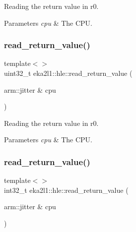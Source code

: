 Reading the return value in r0. 


\begin{DoxyParams}{Parameters}
{\em cpu} & The C\+PU. \\
\hline
\end{DoxyParams}
\mbox{\label{namespaceeka2l1_1_1hle_abddacbce52d394bce6e0b07d40fea31c}} 
\subsubsection{\texorpdfstring{read\+\_\+return\+\_\+value()}{read\_return\_value()}\hspace{0.1cm}{\footnotesize\ttfamily [2/5]}}
{\footnotesize\ttfamily template$<$$>$ \\
uint32\+\_\+t eka2l1\+::hle\+::read\+\_\+return\+\_\+value (\begin{DoxyParamCaption}\item[{arm\+::jitter \&}]{cpu }\end{DoxyParamCaption})}



Reading the return value in r0. 


\begin{DoxyParams}{Parameters}
{\em cpu} & The C\+PU. \\
\hline
\end{DoxyParams}
\mbox{\label{namespaceeka2l1_1_1hle_aa6a9bac062ed454de970279a2e54df31}} 
\subsubsection{\texorpdfstring{read\+\_\+return\+\_\+value()}{read\_return\_value()}\hspace{0.1cm}{\footnotesize\ttfamily [3/5]}}
{\footnotesize\ttfamily template$<$$>$ \\
int32\+\_\+t eka2l1\+::hle\+::read\+\_\+return\+\_\+value (\begin{DoxyParamCaption}\item[{arm\+::jitter \&}]{cpu }\end{DoxyParamCaption})}



